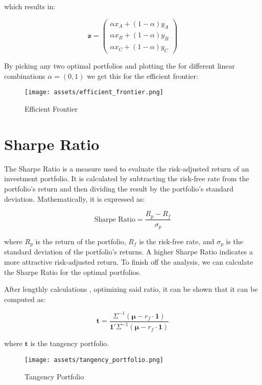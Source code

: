 \documentclass[journal,transmag]{IEEEtran}
\begin{document}
which results in:

\begin{equation}
\mathbf{z} = 
\begin{pmatrix}
\alpha x_A + (1 - \alpha) y_A \\
\alpha x_B + (1 - \alpha) y_B \\
\alpha x_C + (1 - \alpha) y_C
\end{pmatrix}
\end{equation}

By picking any two optimal portfolios and plotting the for different linear combinations $\alpha = (0,1)$ we get this for the efficient frontier:
\begin{figure}[H]
  \centering
  \texttt{[image: assets/efficient\_frontier.png]}
  \caption{Efficient Frontier}
  \end{figure}
\section{Sharpe Ratio}
The Sharpe Ratio is a measure used to evaluate the risk-adjusted return of an investment portfolio.
It is calculated by subtracting the risk-free rate from the portfolio's return and then dividing the 
result by the portfolio's standard deviation. Mathematically, it is expressed as:

\begin{equation}
\text{Sharpe Ratio} = \frac{R_p - R_f}{\sigma_p}
\end{equation}

where \( R_p \) is the return of the portfolio, \( R_f \) is the risk-free rate, and \( \sigma_p \) is the standard deviation of the portfolio's returns. A higher Sharpe Ratio indicates a more attractive risk-adjusted return. To finish off the analysis, we can calculate the Sharpe Ratio for the optimal portfolios.

After lengthly calculations \cite{zivot2013}, optimizing said ratio, it can be shown that it can be computed as:

\begin{equation}
\mathbf{t} = \frac{\Sigma^{-1}(\boldsymbol{\mu} - r_f \cdot \mathbf{1})}{\mathbf{1}'\Sigma^{-1}(\boldsymbol{\mu} - r_f \cdot \mathbf{1})}
\end{equation}

\noindent where $\mathbf{t}$ is the tangency portfolio. 

\begin{figure}[H]
  \centering
  \texttt{[image: assets/tangency\_portfolio.png]}
  \caption{Tangency Portfolio}
  \end{figure}
\end{document}

